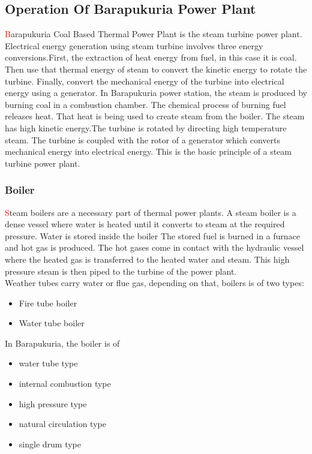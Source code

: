 \documentclass[11 pt]{article}
\begin{document}
\subsection{Operation Of Barapukuria Power Plant}
{\huge\textcolor{red}{\hspace{5 mm}B}}arapukuria Coal Based Thermal Power Plant is the steam turbine power plant. Electrical energy generation using steam turbine involves three energy conversions.First, the extraction of heat energy from fuel, in this case it is coal. Then use that thermal energy of steam to convert the kinetic energy to rotate the turbine. Finally, convert the mechanical energy of the turbine into electrical energy using a generator. In Barapukuria power station, the steam is produced by burning coal in a combustion chamber. The chemical process of burning fuel releases heat. That heat is being used to create steam from the boiler. The steam has high kinetic energy.The turbine is rotated by directing high temperature steam. The turbine is coupled with the rotor of a generator which converts mechanical energy into electrical energy. This is the basic principle of a steam turbine power plant.

\subsubsection{Boiler}
{\huge\textcolor{red}{\hspace{5 mm}S}}team boilers are a necessary part of thermal power plants. A steam boiler is a dense vessel where water is heated until it converts to steam at the required pressure. Water is stored inside the boiler The stored fuel is burned in a furnace and hot gas is produced. The hot gases come in contact with the hydraulic vessel where the heated gas is transferred to the heated water and steam. This high pressure steam is then piped to the turbine of the power plant.\\
Weather tubes carry water or flue gas, depending on that, boilers is of two types:
\newenvironment{myitemize}
{\begin{itemize}}{\end{itemize}}
\begin{myitemize}
	\item Fire tube boiler
	\item Water tube boiler
\end{myitemize}
\vspace{4 mm}
In Barapukuria, the boiler is of
\begin{myitemize}
	\item water tube type
	\item internal combustion type
	\item high pressure type
	\item natural circulation type
	\item single drum type
\end{myitemize}
\vspace{4 mm}
\end{document}
